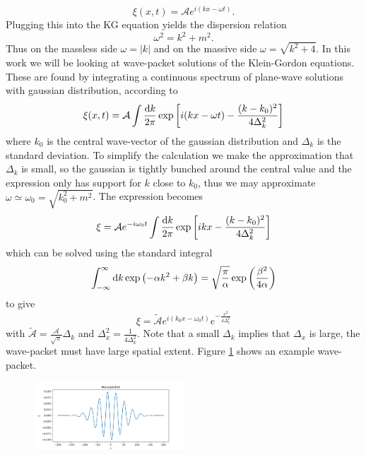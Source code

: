\documentclass[11pt, oneside]{article}  	%
\numberwithin{equation}{section}
\newcommand{\drv}{\ensuremath{\textup{d}}}
\begin{document}
\begin{equation}
\xi(x,t) = \mathcal{A}e^{i(kx-\omega t)}.
\end{equation}
Plugging this into the KG equation yields the dispersion relation
\begin{equation}
\omega^2 = k^2 + m^2.
\end{equation}
Thus on the massless side $\omega = |k|$ and on the massive side $\omega = \sqrt{k^2 + 4}$. In this work we will be looking at wave-packet solutions of the Klein-Gordon equations. These are found by integrating a continuous spectrum of plane-wave solutions with gaussian distribution, according to 
\begin{equation}
\xi (x,t) =\mathcal{A} \int \frac{\drv k}{2\pi} \exp\left[{i(kx-\omega t)} - \frac{(k-k_0)^2}{4\Delta_k^2} \right]
\end{equation}
where $k_0$ is the central wave-vector of the gaussian distribution and $\Delta_k$ is the standard deviation. To simplify the calculation we make the approximation that $\Delta_k$ is small, so the gaussian is tightly bunched around the central value and the expression only has support for $k$ close to $k_0$, thus we may approximate $\omega \simeq \omega_0 = \sqrt{k_0^2 +m^2}$. The expression becomes
\begin{equation} \label{wave_eqn}
\xi =\mathcal{A}e^{-i\omega_0 t} \int \frac{\drv k}{2\pi} \exp\left[{ikx} - \frac{(k-k_0)^2}{4\Delta_k^2} \right]
\end{equation}
which can be solved using the standard integral
\begin{equation}
\int_{-\infty}^{\infty} \drv k\exp \left ( -\alpha k^2 + \beta k \right ) = \sqrt{\frac{\pi}{\alpha}}\exp\left( \frac{\beta^2}{4\alpha}\right ) 
\end{equation}
to give
\begin{equation}
\xi =\tilde{\mathcal{A}}e^{i(k_0 x-\omega_0 t)} e^{-\frac{x^2}{4\Delta_x^2}}
\end{equation}
with $\tilde{\mathcal{A}} = \frac{\mathcal{A}}{\sqrt{\pi}}\Delta_k $ and $\Delta_x^2 = \frac{1}{4\Delta_k^2}$. Note that a small $\Delta_k$ implies that $\Delta_x$ is large, the wave-packet must have large spatial extent. Figure \ref{wavepacket} shows an example wave-packet.
\begin{figure}
\centering
\includegraphics[width=0.5\textwidth]{wavepacket.png}
 \label{wavepacket}
\end{figure}
\end{document}
